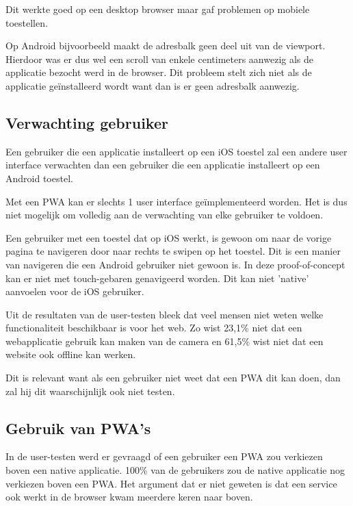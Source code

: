 			Dit werkte goed op een desktop browser maar gaf problemen op mobiele toestellen.
			
			Op Android bijvoorbeeld maakt de adresbalk geen deel uit van de viewport. Hierdoor was er dus wel een scroll van enkele centimeters aanwezig als de applicatie bezocht werd in de browser. Dit probleem stelt zich niet als de applicatie geïnstalleerd wordt want dan is er geen adresbalk aanwezig.
			
	\subsection{Verwachting gebruiker}
		Een gebruiker die een applicatie installeert op een iOS toestel zal een andere user interface verwachten dan een gebruiker die een applicatie installeert op een Android toestel.
		
		Met een PWA kan er slechts 1 user interface geïmplementeerd worden. Het is dus niet mogelijk om volledig aan de verwachting van elke gebruiker te voldoen.
		
		Een gebruiker met een toestel dat op iOS werkt, is gewoon om naar de vorige pagina te navigeren door naar rechts te swipen op het toestel. Dit is een manier van navigeren die een Android gebruiker niet gewoon is. In deze proof-of-concept kan er niet met touch-gebaren genavigeerd worden. Dit kan niet 'native' aanvoelen voor de iOS gebruiker. 
		
		Uit de resultaten van de user-testen bleek dat veel mensen niet weten welke functionaliteit beschikbaar is voor het web. Zo wist 23,1\% niet dat een webapplicatie gebruik kan maken van de camera en 61,5\% wist niet dat een website ook offline kan werken.
		
		Dit is relevant want als een gebruiker niet weet dat een PWA dit kan doen, dan zal hij dit waarschijnlijk ook niet testen. 
		
	\subsection{Gebruik van PWA's}
		In de user-testen werd er gevraagd of een gebruiker een PWA zou verkiezen boven een native applicatie. 
		100\% van de gebruikers zou de native applicatie nog verkiezen boven een PWA. Het argument dat er niet geweten is dat een service ook werkt in de browser kwam meerdere keren naar boven.
		

